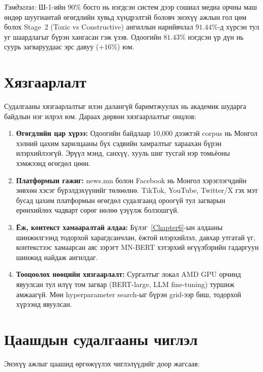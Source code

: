 \textit{Тэмдэглэл:} Ш-1-ийн $90\%$ босго нь нэгдсэн систем дээр сошиал медиа
орчны маш өндөр шуугиантай өгөгдлийн хувьд хүндрэлтэй боловч энэхүү ажлын
гол цөм болох Stage~2 (Toxic vs Constructive) ангиллын нарийвчлал $91.44\%$-д
хүрсэн тул уг шаардлагыг бүрэн хангасан гэж үзэв. Одоогийн $81.43\%$ нэгдсэн
үр дүн нь суурь загваруудаас эрс давуу (+$16\%$) юм.

\section{Хязгаарлалт}

Судалгааны хязгаарлалтыг илэн далангүй баримтжуулах нь академик шударга байдлын
нэг илрэл юм. Дараах дөрвөн хязгаарлалтыг онцлов:

\begin{enumerate}
  \item \textbf{Өгөгдлийн цар хүрээ:} Одоогийн байдлаар 10,000 дээжтэй
    corpus нь Монгол хэлний цахим харилцааны бүх сэдвийн хамралтыг хараахан
    бүрэн илэрхийлээгүй. Эрүүл мэнд, санхүү, хууль шиг тусгай нэр томьёоны
    хэмжээнд өгөгдөл цөөн.
  \item \textbf{Платформын гажиг:} news.mn болон Facebook нь Монгол хэрэглэгчдийн
    зөвхөн хэсэг бүрэлдэхүүнийг төлөөлнө. TikTok, YouTube, Twitter/X гэх мэт
    бусад цахим платформын өгөгдөл судалгаанд ороогүй тул загварын ерөнхийлөх
    чадварт сөрөг нөлөө үзүүлж болзошгүй.
  \item \textbf{Ёж, контекст хамааралтай алдаа:} Бүлэг~\ref{Chapter6}-ын алдааны
    шинжилгээнд тодорхой харагдсанчлан, ёжтой илэрхийлэл, давхар утгатай
    үг, контекстээс хамаарсан аяс зэрэгт MN-BERT хэтэрхий өгүүлбэрийн
    гадаргуун шинжид найдаж ангилдаг.
  \item \textbf{Тооцоолох нөөцийн хязгаарлалт:} Сургалтыг локал AMD GPU орчинд
    явуулсан тул илүү том загвар (BERT-large, LLM fine-tuning) туршиж
    амжаагүй. Мөн hyperparameter search-ыг бүрэн grid-ээр биш, тодорхой
    хүрээнд явуулсан.
\end{enumerate}

\section{Цаашдын судалгааны чиглэл}

Энэхүү ажлыг цаашид өргөжүүлэх чиглэлүүдийг доор жагсаав:

